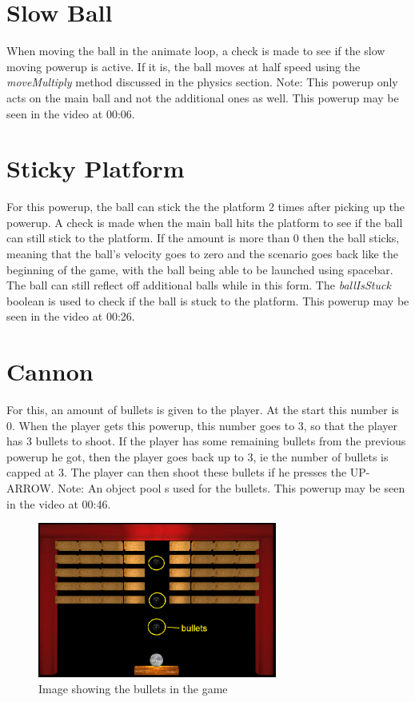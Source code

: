 \section{Slow Ball}
When moving the ball in the animate loop, a check is made to see if the slow moving powerup is active. If it is, the ball moves at half speed using the \textit{moveMultiply} method discussed in the physics section. Note: This powerup only acts on the main ball and not the additional ones as well. This powerup may be seen in the video at 00:06.

\section{Sticky Platform}
For this powerup, the ball can stick the the platform 2 times after picking up the powerup. A check is made when the main ball hits the platform to see if the ball can still stick to the platform. If the amount is more than 0 then the ball sticks, meaning that the ball's velocity goes to zero and the scenario goes back like the beginning of the game, with the ball being able to be launched using spacebar. The ball can still reflect off additional balls while in this form. The \textit{ballIsStuck} boolean is used to check if the ball is stuck to the platform.  This powerup may be seen in the video at 00:26.

\section{Cannon}
For this, an amount of bullets is given to the player. At the start this number is 0. When the player gets this powerup, this number goes to 3, so that the player has 3 bullets to shoot. If the player has some remaining bullets from the previous powerup he got, then the player goes back up to 3, ie the number of bullets is capped at 3. The player can then shoot these bullets if he presses the UP-ARROW. Note: An object pool s used for the bullets. This powerup may be seen in the video at 00:46.

\begin{figure}[H]
	\centering
	\includegraphics[width=0.7\textwidth]{Images/bullets.png}
	\caption{Image showing the bullets in the game}
\end{figure}